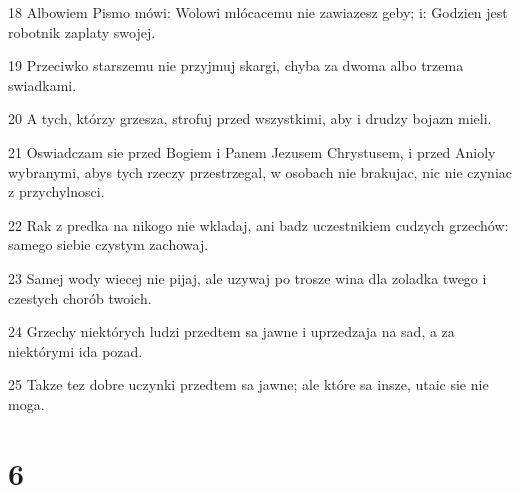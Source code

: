 \par 18 Albowiem Pismo mówi: Wolowi mlócacemu nie zawiazesz geby; i: Godzien jest robotnik zaplaty swojej.
\par 19 Przeciwko starszemu nie przyjmuj skargi, chyba za dwoma albo trzema swiadkami.
\par 20 A tych, którzy grzesza, strofuj przed wszystkimi, aby i drudzy bojazn mieli.
\par 21 Oswiadczam sie przed Bogiem i Panem Jezusem Chrystusem, i przed Anioly wybranymi, abys tych rzeczy przestrzegal, w osobach nie brakujac, nic nie czyniac z przychylnosci.
\par 22 Rak z predka na nikogo nie wkladaj, ani badz uczestnikiem cudzych grzechów: samego siebie czystym zachowaj.
\par 23 Samej wody wiecej nie pijaj, ale uzywaj po trosze wina dla zoladka twego i czestych chorób twoich.
\par 24 Grzechy niektórych ludzi przedtem sa jawne i uprzedzaja na sad, a za niektórymi ida pozad.
\par 25 Takze tez dobre uczynki przedtem sa jawne; ale które sa insze, utaic sie nie moga.

\chapter{6}

